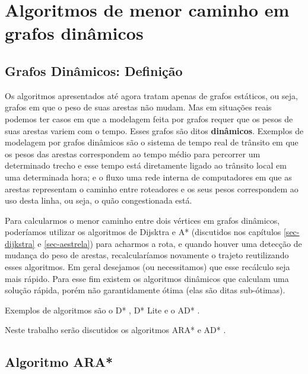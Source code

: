 \chapter{Algoritmos de menor caminho em grafos dinâmicos}
\label{sec-dinamicos}

\section{Grafos Dinâmicos: Definição}
\label{sec-dinamicos-grafos}
Os algoritmos apresentados até agora tratam apenas de grafos estáticos, ou seja, grafos em que o peso de suas arestas não mudam. Mas em situações reais podemos ter casos em que a modelagem feita por grafos requer que os pesos de suas arestas variem com o tempo. Esses grafos são ditos \textbf{dinâmicos}. Exemplos de modelagem por grafos dinâmicos são o sistema de tempo real de trânsito em que os pesos das arestas correspondem ao tempo médio para percorrer um determinado trecho e esse tempo está diretamente ligado ao trânsito local em uma determinada hora; e o fluxo uma rede interna de computadores em que as arestas representam o caminho entre roteadores e os seus pesos correspondem ao uso desta linha, ou seja, o quão congestionada está.

Para calcularmos o menor caminho entre dois vértices em grafos dinâmicos, poderíamos utilizar os algoritmos de Dijsktra e A* (discutidos nos capítulos \ref{sec-dijkstra} e \ref{sec-aestrela})  para acharmos a rota, e quando houver uma detecção de mudança do peso de arestas, recalcularíamos novamente o trajeto reutilizando esses algoritmos. Em geral desejamos (ou necessitamos) que esse recálculo seja mais rápido. Para esse fim existem os algoritmos dinâmicos que calculam uma solução rápida, porém não garantidamente ótima (elas são ditas sub-ótimas).

Exemplos de algoritmos são o D* \cite{stentz1994optimal}, D* Lite \cite{koenig2002d} e o AD* \cite{likhachev2008anytime}.

Neste trabalho serão discutidos os algoritmos ARA* e AD* \cite{likhachev2008anytime}.
\section{Algoritmo ARA*}
\label{sec-dinamicos-ara}

